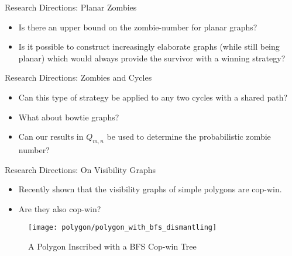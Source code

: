 \begin{frame}{Research Directions: Planar Zombies}
\begin{itemize}
  \item<1->Is there an upper bound on the zombie-number for planar graphs?

  \item<2->Is it possible to construct increasingly elaborate graphs (while still being planar) which would always provide the survivor with a winning strategy?
\end{itemize}
\end{frame}

\begin{frame}{Research Directions: Zombies and Cycles}
\begin{itemize}
  \item Can this type of strategy be applied to any two cycles with a shared path?

  \item What about bowtie graphs?

  \item Can our results in $Q_{m,n}$ be used to determine the probabilistic zombie number?
\end{itemize}

\end{frame}


\begin{frame}{Research Directions: On Visibility Graphs}
\begin{itemize}
  \item Recently shown that the visibility graphs of simple polygons are cop-win.

  \item Are they also cop-win?

  \end{itemize}
  \begin{figure}
  \centering
  \texttt{[image: polygon/polygon\_with\_bfs\_dismantling]}
  \caption{A Polygon Inscribed with a BFS Cop-win Tree \label{fig:polygon_with_bfs_dismantling}}
\end{figure}
\end{frame}
